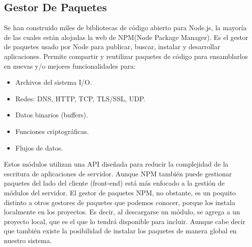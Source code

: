 \documentclass[11pt,letterpaper]{report}
\begin{document}
		\subsection{Gestor De Paquetes }
		Se han construido miles de bibliotecas de código abierto para Node.js, la mayoría de las cuales están alojadas la web de NPM(Node Package Manager).
Es el gestor de paquetes usado por Node para publicar, buscar, instalar y desarrollar aplicaciones. Permite compartir y reutilizar paquetes de código para ensamblarlos en nuevas y/o mejores funcionalidades para:
		\begin{itemize}
		\item Archivos del sistema I/O.
		\item Redes: DNS, HTTP, TCP, TLS/SSL, UDP.
		\item Datos binarios (buffers).
		\item Funciones criptográficas.
		\item Flujos de datos.
		\end{itemize}
		Estos módulos utilizan una API diseñada para reducir la complejidad de la escritura de aplicaciones de servidor.
Aunque NPM también puede gestionar paquetes del lado del cliente (front-end) está más enfocado a la gestión de módulos del servidor.
El gestor de paquetes NPM, no obstante, es un poquito distinto a otros gestores de paquetes que podemos conocer, porque los instala localmente en los proyectos. Es decir, al descargarse un módulo, se agrega a un proyecto local, que es el que lo tendrá disponible para incluir. Aunque cabe decir que también existe la posibilidad de instalar los paquetes de manera global en nuestro sistema.
\end{document}
